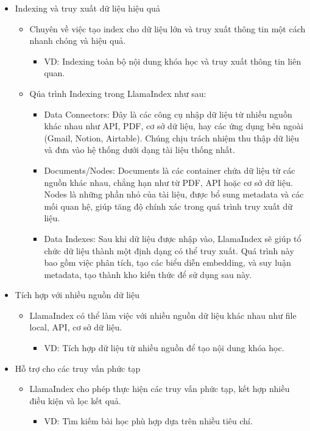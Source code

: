 \begin{itemize}
    \item Indexing và truy xuất dữ liệu hiệu quả
        \begin{itemize}
        \item Chuyên về việc tạo index cho dữ liệu lớn và truy xuất thông tin một cách nhanh chóng và hiệu quả.
        \begin{itemize}
            \item VD: Indexing toàn bộ nội dung khóa học và truy xuất thông tin liên quan.
        \end{itemize}
        \item Qúa trình Indexing trong LlamaIndex như sau:
        \begin{itemize}
            \item Data Connectors: Đây là các công cụ nhập dữ liệu từ nhiều nguồn khác nhau như API, PDF, cơ sở dữ liệu, hay các ứng dụng bên ngoài (Gmail, Notion, Airtable). Chúng chịu trách nhiệm thu thập dữ liệu và đưa vào hệ thống dưới dạng tài liệu thống nhất.
            \item Documents/Nodes: Documents là các container chứa dữ liệu từ các nguồn khác nhau, chẳng hạn như từ PDF, API hoặc cơ sở dữ liệu. Nodes là những phần nhỏ của tài liệu, được bổ sung metadata và các mối quan hệ, giúp tăng độ chính xác trong quá trình truy xuất dữ liệu.
            \item Data Indexes: Sau khi dữ liệu được nhập vào, LlamaIndex sẽ giúp tổ chức dữ liệu thành một định dạng có thể truy xuất. Quá trình này bao gồm việc phân tích, tạo các biểu diễn embedding, và suy luận metadata, tạo thành kho kiến thức để sử dụng sau này.
        \end{itemize}
        \end{itemize}
    \item Tích hợp với nhiều nguồn dữ liệu
            \begin{itemize}
        \item LlamaIndex có thể làm việc với nhiều nguồn dữ liệu khác nhau như file local, API, cơ sở dữ liệu.
        \begin{itemize}
            \item VD: Tích hợp dữ liệu từ nhiều nguồn để tạo nội dung khóa học.
        \end{itemize}
        \end{itemize}
    \item Hỗ trợ cho các truy vấn phức tạp
            \begin{itemize}
        \item LlamaIndex cho phép thực hiện các truy vấn phức tạp, kết hợp nhiều điều kiện và lọc kết quả.
        \begin{itemize}
            \item VD: Tìm kiếm bài học phù hợp dựa trên nhiều tiêu chí.
        \end{itemize}
        \end{itemize}
\end{itemize}
